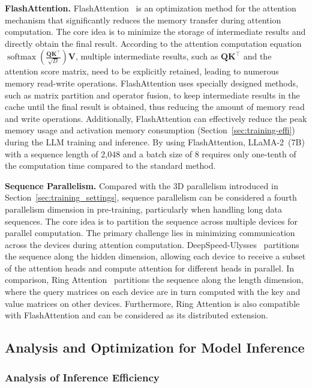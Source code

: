 \textbf{FlashAttention.}
FlashAttention~\cite{Dao-nips-2022-flashattention,Dao-2023-arxiv-flashattention2} is an optimization method for the attention mechanism that significantly reduces the memory transfer during attention computation. The core idea is to minimize the storage of intermediate results and directly obtain the final result. According to the attention computation equation $\operatorname{softmax}(\frac{\bm{Q}\bm{K}^{\intercal}}{\sqrt{D}})\bm{V}$, multiple intermediate results, such as $\bm{Q}\bm{K}^{\intercal}$ and the attention score matrix, need to be explicitly retained, leading to numerous memory read-write operations. FlashAttention uses specially designed methods, such as matrix partition and operator fusion, to keep intermediate results in the cache until the final result is obtained, thus reducing the amount of memory read and write operations. Additionally, FlashAttention can effectively reduce the peak memory usage and activation memory consumption (Section~\ref{sec:training-effi}) during the LLM training and inference. By using FlashAttention, LLaMA-2~(7B) with a sequence length of 2,048 and a batch size of 8 requires only one-tenth of the computation time compared to the standard method.

\textbf{Sequence Parallelism.} Compared with the 3D parallelism introduced in Section~\ref{sec:training_settings}, sequence parallelism can be considered a fourth parallelism dimension in pre-training, particularly when handling long data sequences. The core idea is to partition the sequence across multiple devices for parallel computation. The primary challenge lies in minimizing communication across the devices during attention computation. DeepSpeed-Ulysses~\cite{Jacobs-arxiv-2023-deepspeed} partitions the sequence along the hidden dimension, allowing each device to receive a subset of the attention heads and compute attention for different heads in parallel. In comparison, Ring Attention~\cite{Liu-arxiv-2023-ring} partitions the sequence along the {length dimension}, where the query matrices on each device are in turn computed with the key and value matrices on other devices. Furthermore, Ring Attention is also compatible with FlashAttention and can be considered as its distributed extension.

\subsection{Analysis and Optimization for {Model Inference}}

\subsubsection{Analysis of Inference Efficiency}

